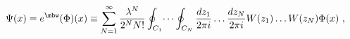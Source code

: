 \begin{equation}\label{redef}
\Psi(x)=e^{\mbw}(\Phi)(x)\equiv
\sum_{N=1}^{\infty}
\frac{\lambda^N}{2^NN!}\oint_{C_1}\dots
\oint_{C_N}
\frac{dz_1}{2\pi i}\dots \frac{dz_N}
{2\pi i} 
W(z_1)\dots W(z_N)\Phi(x) \ ,
\end{equation}

